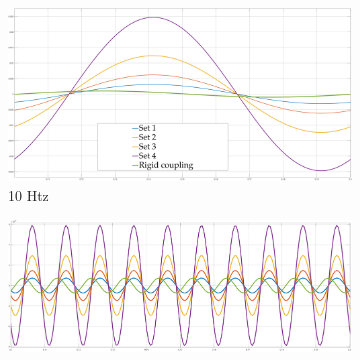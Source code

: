 \begin{figure}
	\begin{subfigure}[h!]{1\linewidth}
		\centering
		\includegraphics[width=\textwidth, height=\textwidth/3]{Images/vibr10Htz}
		\caption{10 Htz}
		\label{fig:10Htz}
	\end{subfigure}	
  \newline
	\begin{subfigure}[h!]{1\linewidth}
		\centering
		\includegraphics[width=\textwidth, height=\textwidth/3]{Images/vibr100Htz}

\end{subfigure}
\end{figure}
